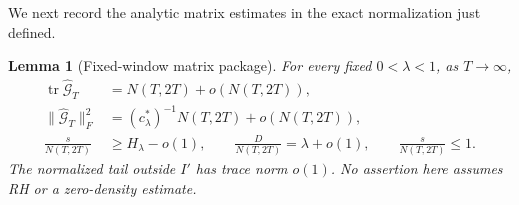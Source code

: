\documentclass[11pt,reqno]{amsart}
\newtheorem{lemma}[theorem]{Lemma}
\theoremstyle{definition}
\theoremstyle{remark}
\DeclareMathOperator{\tr}{tr}
\begin{document}
We next record the analytic matrix estimates in the exact normalization just
defined.

\begin{lemma}[Fixed-window matrix package]\label{lem:matrix-package}
For every fixed $0<\lambda<1$, as $T\to\infty$,
\begin{align}
 \tr\widehat{\mathcal G}_T&=N(T,2T)+o(N(T,2T)),\label{eq:trace-one}\\
 \|\widehat{\mathcal G}_T\|_F^2
   &=(c_\lambda^*)^{-1}N(T,2T)+o(N(T,2T)),\label{eq:trace-two}\\
 \frac{s}{N(T,2T)}&\ge H_\lambda-o(1),\qquad
 \frac{D}{N(T,2T)}=\lambda+o(1),\qquad
 \frac{s}{N(T,2T)}\le1.\label{eq:parent-density}
\end{align}
The normalized tail outside $I'$ has trace norm $o(1)$.
No assertion here assumes RH or a zero-density estimate.
\end{lemma}
\end{document}
